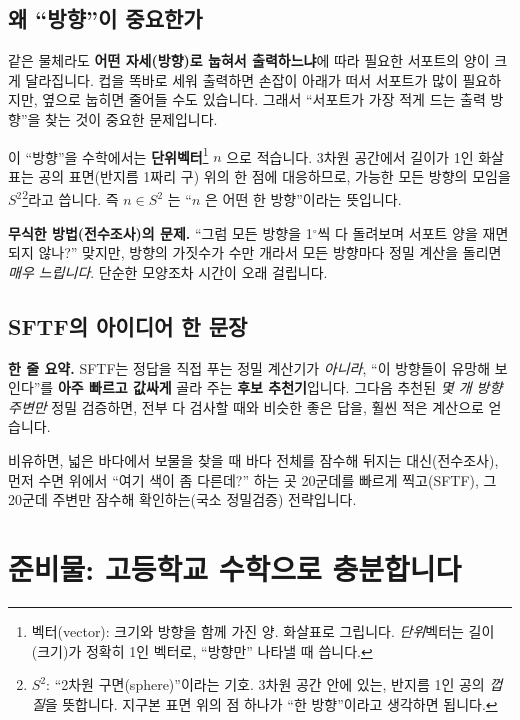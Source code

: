 \documentclass[11pt,a4paper]{article}
\begin{document}
\subsection{왜 ``방향''이 중요한가}

같은 물체라도 \textbf{어떤 자세(방향)로 눕혀서 출력하느냐}에 따라 필요한 서포트의
양이 크게 달라집니다. 컵을 똑바로 세워 출력하면 손잡이 아래가 떠서 서포트가 많이
필요하지만, 옆으로 눕히면 줄어들 수도 있습니다. 그래서 ``서포트가 가장 적게 드는
출력 방향''을 찾는 것이 중요한 문제입니다.

이 ``방향''을 수학에서는 \textbf{단위벡터}\footnote{벡터(vector): 크기와 방향을
함께 가진 양. 화살표로 그립니다. \emph{단위}벡터는 길이(크기)가 정확히 1인 벡터로,
``방향만'' 나타낼 때 씁니다.} $n$ 으로 적습니다. 3차원 공간에서 길이가 1인 화살표는
공의 표면(반지름 1짜리 구) 위의 한 점에 대응하므로, 가능한 모든 방향의 모임을
$S^2$\footnote{$S^2$: ``2차원 구면(sphere)''이라는 기호. 3차원 공간 안에 있는,
반지름 1인 공의 \emph{껍질}을 뜻합니다. 지구본 표면 위의 점 하나가 ``한 방향''이라고
생각하면 됩니다.}라고 씁니다. 즉 $n \in S^2$ 는 ``$n$ 은 어떤 한 방향''이라는 뜻입니다.

\begin{notebox}
\textbf{무식한 방법(전수조사)의 문제.} ``그럼 모든 방향을 1$^\circ$씩 다 돌려보며
서포트 양을 재면 되지 않나?'' 맞지만, 방향의 가짓수가 수만 개라서 모든 방향마다
정밀 계산을 돌리면 \emph{매우 느립니다}. 단순한 모양조차 시간이 오래 걸립니다.
\end{notebox}

\subsection{SFTF의 아이디어 한 문장}

\begin{readbox}
\textbf{한 줄 요약.} SFTF는 정답을 직접 푸는 정밀 계산기가 \emph{아니라},
``이 방향들이 유망해 보인다''를 \textbf{아주 빠르고 값싸게} 골라 주는
\textbf{후보 추천기}입니다. 그다음 추천된 \emph{몇 개 방향 주변만} 정밀 검증하면,
전부 다 검사할 때와 비슷한 좋은 답을, 훨씬 적은 계산으로 얻습니다.
\end{readbox}

비유하면, 넓은 바다에서 보물을 찾을 때 바다 전체를 잠수해 뒤지는 대신(전수조사),
먼저 수면 위에서 ``여기 색이 좀 다른데?'' 하는 곳 20군데를 빠르게 찍고(SFTF),
그 20군데 주변만 잠수해 확인하는(국소 정밀검증) 전략입니다.

\section{준비물: 고등학교 수학으로 충분합니다}
\end{document}
